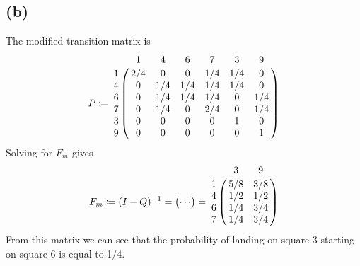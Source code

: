 \documentclass{article}
\begin{document}
\subsection{(b)}
The modified transition matrix is 
\begin{equation}
	P \coloneqq \bordermatrix{~ & 1 & 4 & 6 & 7 & 3 & 9 \cr
		1 & 2/4 & 0 & 0 & 1/4 & 1/4 & 0 \cr
		4 & 0 & 1/4 & 1/4 & 1/4 & 1/4 & 0 \cr
		6 & 0 & 1/4 & 1/4 & 1/4 & 0 & 1/4 \cr
		7 & 0 & 1/4 & 0 & 2/4 & 0 & 1/4 \cr
		3 & 0 & 0 & 0 & 0 & 1 & 0 \cr
		9 & 0 & 0 & 0 & 0 & 0 & 1 \cr
		}
\end{equation}
Solving for $F_m$ gives
$$ F_m \coloneqq (I - Q)^{-1} = \begin{pmatrix}
		\cdots \\
	\end{pmatrix} = 
	  \bordermatrix{~ & 3 & 9 \cr
		1 & 5/8 & 3/8 \cr
		4 & 1/2 & 1/2 \cr
		6 & 1/4 & 3/4 \cr
		7 & 1/4 & 3/4 \cr
		}
$$
From this matrix we can see that the probability of landing on square 3 starting on square 6 is equal to 1/4.

\appendix
\end{document}
